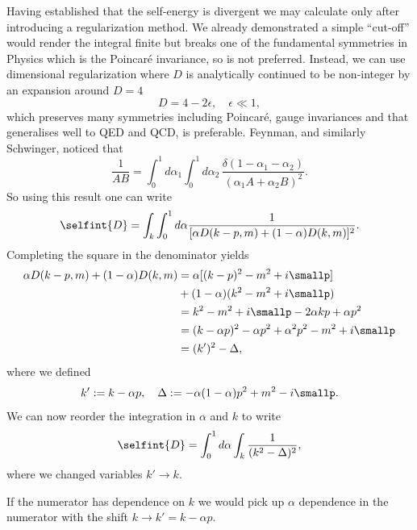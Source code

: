 Having established that the self-energy is divergent we may calculate only after introducing a regularization method. We already demonstrated a simple ``cut-off'' would render the integral finite but breaks one of the fundamental symmetries in Physics which is the Poincaré invariance, so is not preferred. Instead, we can use dimensional regularization where $D$ is analytically continued to be non-integer by an expansion around $D = 4$
\begin{equation}
    D = 4 - 2\epsilon,\quad \epsilon \ll 1,
\end{equation}
which preserves many symmetries including Poincaré, gauge invariances and that generalises well to QED and QCD, is preferable. Feynman, and similarly Schwinger, noticed that
\begin{equation}
    \frac{1}{AB} = \int_0^1 d\alpha_1\int_0^1 d\alpha_2\,\frac{\delta(1 - \alpha_1 - \alpha_2)}{(\alpha_1A + \alpha_2B)^2}.
\end{equation}
So using this result one can write
\begin{equation}
    \selfint{D} = \int_k\int_0^1 d\alpha \frac{1}{[\alpha D(k - p,m) + (1 - \alpha)D(k,m)]^2}.
\end{equation}
Completing the square in the denominator yields 
\begin{equation}
    \begin{split}
        \alpha D(k - p,m) + (1 - \alpha)D(k,m) &= \alpha[(k - p)^2 - m^2 + i\smallp] \\
        &+ (1 - \alpha)(k^2 - m^2 + i\smallp) \\
        &= k^2 - m^2 + i\smallp - 2\alpha kp + \alpha p^2 \\
        &= (k -\alpha p)^2 -\alpha p^2 + \alpha^2 p^2 - m^2 + i\smallp \\
        &= (k')^2 - \Delta,
    \end{split}
\end{equation}
where we defined
\begin{equation}
    k' := k - \alpha p,\quad \Delta := -\alpha(1 - \alpha)p^2 + m^2 - i\smallp.   
\end{equation}
We can now reorder the integration in $\alpha$ and $k$ to write 
\begin{equation}
    \selfint{D} = \int_0^1 d\alpha \int_k \frac{1}{(k^2 - \Delta)^2},
\end{equation}
where we changed variables $k' \to k$.
\begin{obs}
    If the numerator has dependence on $k$ we would pick up $\alpha$ dependence in the numerator with the shift $k \to k' = k - \alpha p$.
\end{obs}
